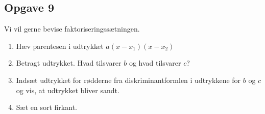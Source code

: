 \subsection*{Opgave 9}
Vi vil gerne bevise faktoriseringssætningen. 
\begin{enumerate}[label=\roman*)]
	\item Hæv parentesen i udtrykket $a(x-x_1)(x-x_2)$
	\item Betragt udtrykket. Hvad tilsvarer $b$ og hvad tilsvarer $c$?
	\item Indsæt udtrykket for rødderne fra diskriminantformlen i udtrykkene for $b$ og $c$ og vis, at 
	udtrykket bliver sandt. 
	\item Sæt en sort firkant.
\end{enumerate}
